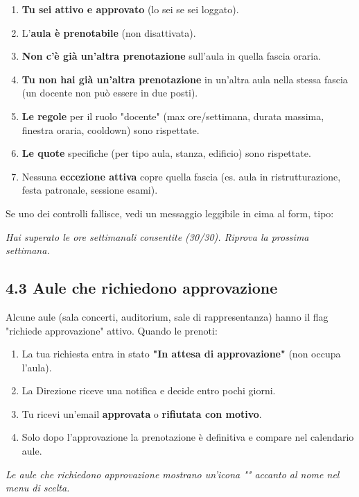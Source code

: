 \documentclass[11pt,a4paper]{article}
\renewenvironment{quote}
  {\begin{list}{}{%
      \setlength{\leftmargin}{8pt}%
      \setlength{\rightmargin}{8pt}%
      \setlength{\topsep}{6pt}%
      \setlength{\parsep}{0pt}}%
      \item\relax\color{black!75}\itshape}
  {\end{list}}
\begin{document}
\begin{enumerate}
  \item \textbf{Tu sei attivo e approvato} (lo sei se sei loggato).
  \item L'\textbf{aula è prenotabile} (non disattivata).
  \item \textbf{Non c'è già un'altra prenotazione} sull'aula in quella fascia oraria.
  \item \textbf{Tu non hai già un'altra prenotazione} in un'altra aula nella stessa fascia (un docente non può essere in due posti).
  \item \textbf{Le regole} per il ruolo "docente" (max ore/settimana, durata massima, finestra oraria, cooldown) sono rispettate.
  \item \textbf{Le quote} specifiche (per tipo aula, stanza, edificio) sono rispettate.
  \item Nessuna \textbf{eccezione attiva} copre quella fascia (es. aula in ristrutturazione, festa patronale, sessione esami).
\end{enumerate}

Se uno dei controlli fallisce, vedi un messaggio leggibile in cima al form, tipo:

\begin{quote}
\textit{Hai superato le ore settimanali consentite (30/30). Riprova la prossima settimana.}
\end{quote}

\subsection{4.3 Aule che richiedono approvazione}


Alcune aule (sala concerti, auditorium, sale di rappresentanza) hanno il flag "richiede approvazione" attivo. Quando le prenoti:

\begin{enumerate}
  \item La tua richiesta entra in stato \textbf{"In attesa di approvazione"} (non occupa l'aula).
  \item La Direzione riceve una notifica e decide entro pochi giorni.
  \item Tu ricevi un'email \textbf{approvata} o \textbf{rifiutata con motivo}.
  \item Solo dopo l'approvazione la prenotazione è definitiva e compare nel calendario aule.
\end{enumerate}

\begin{quote}
Le aule che richiedono approvazione mostrano un'icona "\checkmark{}" accanto al nome nel menu di scelta.
\end{quote}
\end{document}

